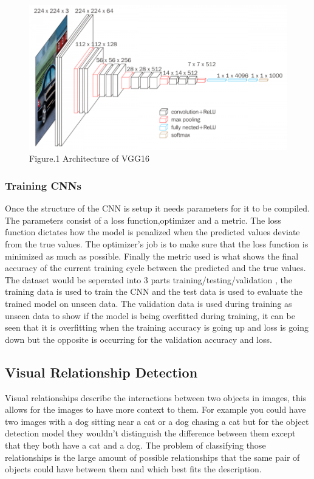 \documentclass{csfyp}
\begin{document}
\begin{figure}[t]
\includegraphics[scale=0.35]{vgg16.pdf}
\centering
\\
Figure.1 Architecture of VGG16
\end{figure}

\subsubsection{Training CNNs}
Once the structure of the CNN is setup it needs parameters for it to be compiled. The parameters consist of a loss function,optimizer and a metric. The loss function dictates how the model is penalized when the predicted values deviate from the true values. The optimizer’s job is to make sure that the loss function is minimized as much as possible. Finally the metric used is what shows the final accuracy of the current training cycle between the predicted and the true values. The dataset would be seperated into 3 parts training/testing/validation , the training data is used to train the CNN and the test data is used to evaluate the trained model on unseen data. The validation data is used during training as unseen data to show if the model is being overfitted during training, it can be seen that it is overfitting when the training accuracy is going up and loss is going down but the opposite is occurring for the validation accuracy and loss. 


\subsection{Visual Relationship Detection}
Visual relationships describe the interactions between two objects in images, this allows for the images to have more context to them. For example you could have two images with a dog sitting near a cat or a dog chasing a cat but for the object detection model they wouldn't distinguish the difference between them except that they both have a cat and a dog. The problem of classifying those relationships is the large amount of possible relationships that the same pair of objects could have between them and which best fits the description. 
\end{document}

